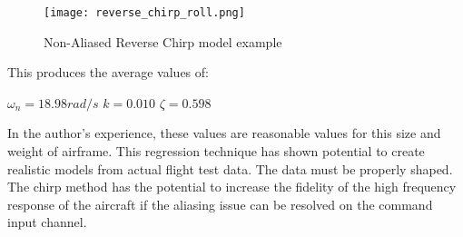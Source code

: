 \begin{figure}[!h]
 \centering
  \texttt{[image: reverse\_chirp\_roll.png]}
  \caption{Non-Aliased Reverse Chirp model example}
  \label{fig:reverse_chirp_model}
\end{figure}

This produces the average values of:

$\omega_n=18.98 rad/s$ \newline
$k = 0.010$ \newline
$\zeta=0.598$ \newline

In the author's experience, these values are reasonable values for this size and weight of airframe.  This regression technique has shown potential to create realistic models from actual flight test data.  The data must be properly shaped.  The chirp method has the potential to increase the fidelity of the high frequency response of the aircraft if the aliasing issue can be resolved on the command input channel.


